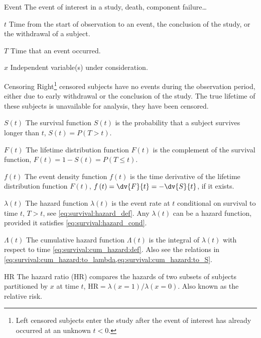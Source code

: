 \begin{symbollist}
  \item[Event] The event of interest in a study, \eg death, component failure\ldots
  \item[$t$] Time from the start of observation to an event, the conclusion of the study, or the withdrawal of a subject.
  \item[$T$] Time that an event occurred.
  \item[$x$] Independent variable(s) under consideration.
  \item[Censoring] Right\footnote{Left censored subjects enter the study after the event of interest has already occurred at an unknown $t < 0$.} censored subjects have no events during the observation period, either due to early withdrawal or the conclusion of the study. The true lifetime of these subjects is unavailable for analysis, \ie they have been censored.
  \item[$S\left(t\right)$] The survival function $S\left(t\right)$ is the probability that a subject survives longer than $t$, \ie $S\left(t\right) = P\left(T > t\right)$.
  \item[$F\left(t\right)$] The lifetime distribution function $F\left(t\right)$ is the complement of the survival function, \ie $F\left(t\right) = 1 - S\left(t\right) = P\left(T \leq t\right)$.
  \item[$f\left(t\right)$] The event density function $f\left(t\right)$ is the time derivative of the lifetime distribution function $F\left(t\right)$, $f\left(t\right) = \dv{F}{t} = -\dv{S}{t}$, if it exists.
  \item[$\lambda\left(t\right)$] The hazard function $\lambda\left(t\right)$ is the event rate at $t$ conditional on survival to time $t$, \ie $T > t$, see \cref{eq:survival:hazard_def}. Any $\lambda\left(t\right)$ can be a hazard function, provided it satisfies \cref{eq:survival:hazard_cond}.
  \item[$\Lambda\left(t\right)$] The cumulative hazard function $\Lambda\left(t\right)$ is the integral of $\lambda\left(t\right)$ with respect to time \cref{eq:survival:cum_hazard:def}. Also see the relations in \cref{eq:survival:cum_hazard:to_lambda,eq:survival:cum_hazard:to_S}.
  \item[HR] The hazard ratio (HR) compares the hazards of two subsets of subjects partitioned by $x$ at time $t$, $\text{HR} = \lambda\left(x = 1\right) / \lambda\left(x=0\right)$. Also known as the relative risk.
\end{symbollist}

